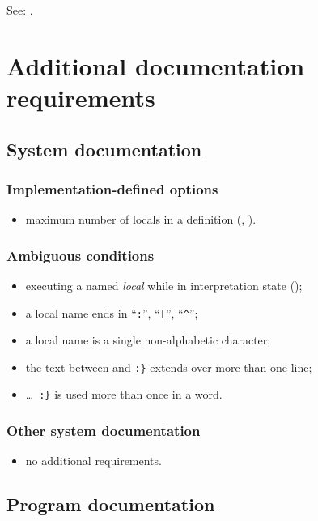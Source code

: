 See: .


\section{Additional documentation requirements} %

\subsection{System documentation} %

\subsubsection{Implementation-defined options} %
\begin{itemize}
\item maximum number of locals in a definition
	(,
	 ).
\end{itemize}

\subsubsection{Ambiguous conditions} %
\label{locals:ambiguous}
\begin{itemize}
\item executing a named \emph{local} while in interpretation state
	();
\item a local name ends in ``\texttt{:}'', ``\texttt{[}'', ``\texttt{\textasciicircum}'';
\item a local name is a single non-alphabetic character;
\item the text between  and \texttt{:\}} extends over more than one line;
\item {} \ldots\ \texttt{:\}} is used more than once in a word.
\end{itemize}

\subsubsection{Other system documentation} %
\begin{itemize}
\item no additional requirements.
\end{itemize}

\subsection{Program documentation} %

